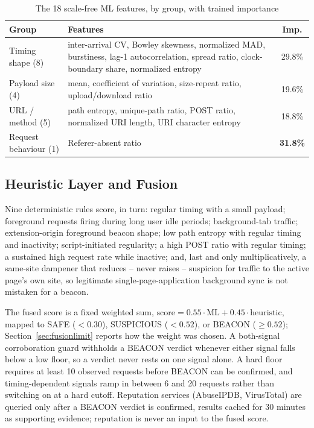 \documentclass[conference,a4paper]{IEEEtran}
\begin{document}
\begin{table}[t]
\caption{The 18 scale-free ML features, by group, with trained importance}
\label{tab:features}
\centering
\small
\setlength{\tabcolsep}{3pt}
\begin{tabular}{p{}p{}c}
\toprule
\textbf{Group} & \textbf{Features} & \textbf{Imp.} \\
\midrule
Timing shape (8) & inter-arrival CV, Bowley skewness, normalized MAD, burstiness, lag-1 autocorrelation, spread ratio, clock-boundary share, normalized entropy & 29.8\% \\
Payload size (4) & mean, coefficient of variation, size-repeat ratio, upload/download ratio & 19.6\% \\
URL / method (5) & path entropy, unique-path ratio, POST ratio, normalized URI length, URI character entropy & 18.8\% \\
Request behaviour (1) & Referer-absent ratio & \textbf{31.8\%} \\
\bottomrule
\end{tabular}
\end{table}

\subsection{Heuristic Layer and Fusion}\label{sec:heuristic}
Nine deterministic rules score, in turn: regular timing with a small payload; foreground requests firing during long user idle periods; background-tab traffic; extension-origin foreground beacon shape; low path entropy with regular timing and inactivity; script-initiated regularity; a high POST ratio with regular timing; a sustained high request rate while inactive; and, last and only multiplicatively, a same-site dampener that reduces -- never raises -- suspicion for traffic to the active page's own site, so legitimate single-page-application background sync is not mistaken for a beacon.

The fused score is a fixed weighted sum, \(\mathrm{score} = 0.55 \cdot \mathrm{ML} + 0.45 \cdot \mathrm{heuristic}\), mapped to SAFE ($<0.30$), SUSPICIOUS ($<0.52$), or BEACON ($\geq 0.52$); Section~\ref{sec:fusionlimit} reports how the weight was chosen. A both-signal corroboration guard withholds a BEACON verdict whenever either signal falls below a low floor, so a verdict never rests on one signal alone. A hard floor requires at least 10 observed requests before BEACON can be confirmed, and timing-dependent signals ramp in between 6 and 20 requests rather than switching on at a hard cutoff. Reputation services (AbuseIPDB, VirusTotal) are queried only after a BEACON verdict is confirmed, results cached for 30 minutes as supporting evidence; reputation is never an input to the fused score.
\end{document}
